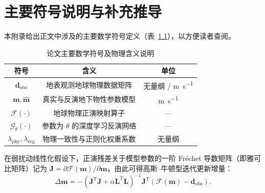 \chapter{主要符号说明与补充推导}

本附录给出正文中涉及的主要数学符号定义（表~\ref{tab:symbols}），以方便读者查阅。

\begin{table}[htbp]
  \centering
  \caption{论文主要数学符号及物理含义说明}
  \label{tab:symbols}
  \begin{tabular}{ccc}
    \toprule
    符号 & 含义 & 单位 \\
    \midrule
    $\mathbf{d}_{\mathrm{obs}}$ & 地表观测地球物理数据矩阵 & 无量纲 / \si{\meter\per\second} \\
    $\mathbf{m}, \hat{\mathbf{m}}$ & 真实与反演地下物性参数模型 & \si{\meter\per\second} \\
    $\mathcal{F}(\cdot)$ & 地球物理正演映射算子 & — \\
    $\mathcal{G}_\theta(\cdot)$ & 参数为 $\theta$ 的深度学习反演网络 & — \\
    $\lambda_{\mathrm{phy}}, \lambda_{\mathrm{reg}}$ & 物理一致性与正则化权重系数 & 无量纲 \\
    \bottomrule
  \end{tabular}
\end{table}

在弱扰动线性化假设下，正演残差关于模型参数的一阶 Fr\'echet 导数矩阵（即雅可比矩阵）记为 $\mathbf{J} = \partial \mathcal{F}(\mathbf{m}) / \partial \mathbf{m}$，由此可得高斯--牛顿型迭代更新增量：
\begin{equation}
  \Delta \mathbf{m} = -\left( \mathbf{J}^{\mathsf{T}}\mathbf{J} + \alpha \mathbf{L}^{\mathsf{T}}\mathbf{L} \right)^{-1}
  \mathbf{J}^{\mathsf{T}}\left( \mathcal{F}(\mathbf{m}) - \mathbf{d}_{\mathrm{obs}} \right).
  \label{eq:gn}
\end{equation}
